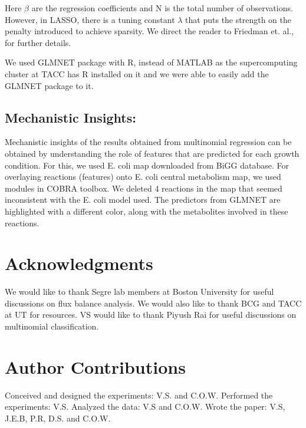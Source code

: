 \documentclass[12pt]{article}
\begin{document}
\noindent
Here $\beta$ are the regression coefficients and N is the total number of observations. However, in LASSO, there is a tuning constant $\lambda$ that puts the strength on the penalty introduced to achieve sparsity. We direct the reader to Friedman et. al., \cite{Friedmanetal2008} for further details.

\bigskip
\noindent
We used GLMNET package with R, instead of MATLAB as the supercomputing cluster at TACC has R installed on it and we were able to easily add the GLMNET package to it.

\subsection*{Mechanistic Insights:} 
Mechanistic insights of the results obtained from multinomial regression can be obtained by understanding the role of features that are predicted for each growth condition. For this, we used E. coli map downloaded from BiGG database. For overlaying reactions (features) onto E. coli central metabolism map, we used modules in COBRA toolbox. We deleted 4 reactions in the map that seemed inconsistent with the E. coli model used. The predictors from GLMNET are highlighted with a different color, along with the metabolites involved in these reactions.


\section*{Acknowledgments}
We would like to thank Segre lab members at Boston University for useful discussions on flux balance analysis. We would also like to thank BCG and TACC at UT for resources. VS would like to thank Piyush Rai for useful discussions on multinomial classification.

\section*{Author Contributions}
Conceived and designed the experiments: V.S. and C.O.W. Performed the experiments: V.S. Analyzed the data: V.S and C.O.W. Wrote the paper: V.S,  J.E.B, P.R, D.S. and C.O.W.


\end{document}
